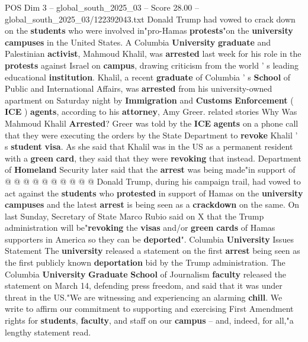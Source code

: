 \begin{textsample}{POS Dim 3 – global\_south\_2025\_03 – Score 28.00 – global\_south\_2025\_03/122392043.txt}  \label{ex:f3_pos_040}
Donald Trump had vowed to crack down on the \textbf{students} who were involved in"pro-Hamas \textbf{protests}"on the \textbf{university} \textbf{campuses} in the United States.
A Columbia \textbf{University} \textbf{graduate} and Palestinian \textbf{activist}, Mahmoud Khalil, was \textbf{arrested} last week for his role in the \textbf{protests} against Israel on \textbf{campus}, drawing criticism from the world ' s leading educational \textbf{institution}.
Khalil, a recent \textbf{graduate} of Columbia ' s \textbf{School} of Public and International Affairs, was \textbf{arrested} from his university-owned apartment on Saturday night by \textbf{Immigration} and \textbf{Customs} \textbf{Enforcement} ( \textbf{ICE} ) \textbf{agents}, according to his \textbf{attorney}, Amy Greer. related stories Why Was Mahmoud Khalil \textbf{Arrested}?
Greer was told by the \textbf{ICE} \textbf{agents} on a phone call that they were executing the orders by the State Department to \textbf{revoke} Khalil ' s \textbf{student} \textbf{visa}.
As she said that Khalil was in the US as a permanent resident with a \textbf{green} \textbf{card}, they said that they were \textbf{revoking} that instead.
Department of \textbf{Homeland} Security later said that the \textbf{arrest} was being made"in support of @ @ @ @ @ @ @ @ @ @ Donald Trump, during his campaign trail, had vowed to act against the \textbf{students} who \textbf{protested} in support of Hamas on the \textbf{university} \textbf{campuses} and the latest \textbf{arrest} is being seen as a \textbf{crackdown} on the same.
On last Sunday, Secretary of State Marco Rubio said on X that the Trump administration will be"\textbf{revoking} the \textbf{visas} and/or \textbf{green} \textbf{cards} of Hamas supporters in America so they can be \textbf{deported}".
Columbia \textbf{University} Issues Statement The \textbf{university} released a statement on the first \textbf{arrest} being seen as the first publicly known \textbf{deportation} bid by the Trump administration.
The Columbia \textbf{University} \textbf{Graduate} \textbf{School} of Journalism \textbf{faculty} released the statement on March 14, defending press freedom, and said that it was under threat in the US."We are witnessing and experiencing an alarming \textbf{chill}.
We write to affirm our commitment to supporting and exercising First Amendment rights for \textbf{students}, \textbf{faculty}, and staff on our \textbf{campus} -- and, indeed, for all,"a lengthy statement read.

\end{textsample}
